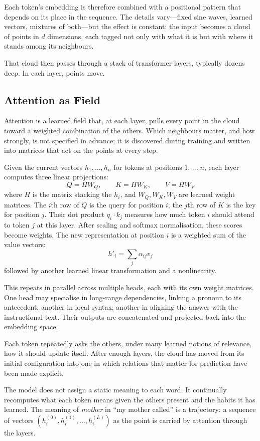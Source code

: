 \documentclass[12pt,a4paper]{article}
\begin{document}
Each token's embedding is therefore combined with a positional pattern that depends on its place in the sequence. The details vary---fixed sine waves, learned vectors, mixtures of both---but the effect is constant: the input becomes a cloud of points in $d$ dimensions, each tagged not only with what it is but with where it stands among its neighbours.

That cloud then passes through a stack of transformer layers, typically dozens deep. In each layer, points move.

\subsection{Attention as Field}

Attention is a learned field that, at each layer, pulls every point in the cloud toward a weighted combination of the others. Which neighbours matter, and how strongly, is not specified in advance; it is discovered during training and written into matrices that act on the points at every step.

Given the current vectors $h_1, \dots, h_n$ for tokens at positions $1, \dots, n$, each layer computes three linear projections:
\[
Q = H W_Q,\qquad K = H W_K,\qquad V = H W_V
\]
where $H$ is the matrix stacking the $h_i$, and $W_Q, W_K, W_V$ are learned weight matrices. The $i$th row of $Q$ is the query for position $i$; the $j$th row of $K$ is the key for position $j$. Their dot product $q_i \cdot k_j$ measures how much token $i$ should attend to token $j$ at this layer. After scaling and softmax normalisation, these scores become weights. The new representation at position $i$ is a weighted sum of the value vectors:
\[
h'_i = \sum_j \alpha_{ij} v_j
\]
followed by another learned linear transformation and a nonlinearity.

This repeats in parallel across multiple heads, each with its own weight matrices. One head may specialise in long-range dependencies, linking a pronoun to its antecedent; another in local syntax; another in aligning the answer with the instructional text. Their outputs are concatenated and projected back into the embedding space.

Each token repeatedly asks the others, under many learned notions of relevance, how it should update itself. After enough layers, the cloud has moved from its initial configuration into one in which relations that matter for prediction have been made explicit.

The model does not assign a static meaning to each word. It continually recomputes what each token means given the others present and the habits it has learned. The meaning of \emph{mother} in ``my mother called'' is a trajectory: a sequence of vectors $(h_i^{(0)}, h_i^{(1)}, \dots, h_i^{(L)})$ as the point is carried by attention through the layers.
\end{document}
